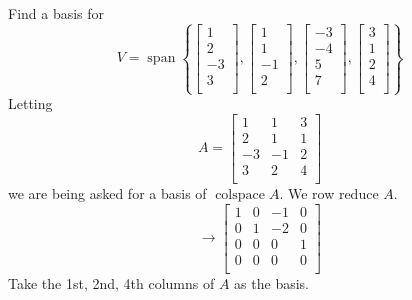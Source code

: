 \documentclass{article}
\DeclareMathOperator{\spn}{span}
\DeclareMathOperator{\colspace}{colspace}
\begin{document}
  \begin{example}
    Find a basis for \[
      V = \spn \left\{
        \begin{bmatrix}
          1\\2\\-3\\3\\
        \end{bmatrix},
        \begin{bmatrix}
          1\\1\\-1\\2\\
        \end{bmatrix},
        \begin{bmatrix}
          -3\\-4\\5\\7\\
        \end{bmatrix},
        \begin{bmatrix}
          3\\1\\2\\4\\
      \end{bmatrix}\right\}
    \]
    Letting \[
      A =
      \begin{bmatrix}
        1 & 1 & 3\\
        2 & 1 & 1\\
        -3 & -1 & 2\\
        3 & 2 & 4\\
    \end{bmatrix}\]
    we are being asked for a basis of $\colspace A$. We row reduce $A$.
    \[
      \to
      \begin{bmatrix}
        1 & 0 & -1 & 0\\
        0 & 1 & -2 & 0\\
        0 & 0 & 0 & 1\\
        0 & 0 & 0 & 0\\
      \end{bmatrix}
    \]
    Take the 1st, 2nd, 4th columns of $A$ as the basis.
  \end{example}
\end{document}
